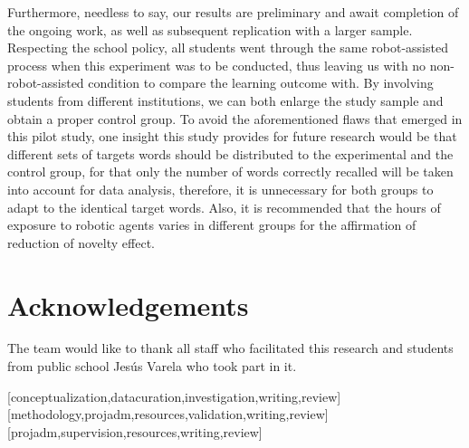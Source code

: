 \documentclass[english]{textolivre}
\begin{document}
Furthermore, needless to say, our results are preliminary and await completion of the ongoing work, as well as subsequent replication with a larger sample. Respecting the school policy, all students went through the same robot-assisted process when this experiment was to be conducted, thus leaving us with no non-robot-assisted condition to compare the learning outcome with. By involving students from different institutions, we can both enlarge the study sample and obtain a proper control group. To avoid the aforementioned flaws that emerged in this pilot study, one insight this study provides for future research would be that different sets of targets words should be distributed to the experimental and the control group, for that only the number of words correctly recalled will be taken into account for data analysis, therefore, it is unnecessary for both groups to adapt to the identical target words. Also, it is recommended that the hours of exposure to robotic agents varies in different groups for the affirmation of reduction of novelty effect.

\section{Acknowledgements}\label{sec-figuras-tabelas}
The team would like to thank all staff who facilitated this research and students from public school Jesús Varela who took part in it.


\printbibliography\label{sec-bib}


\begin{contributors}
[conceptualization,datacuration,investigation,writing,review]
[methodology,projadm,resources,validation,writing,review]
[projadm,supervision,resources,writing,review]
\end{contributors}
\end{document}
